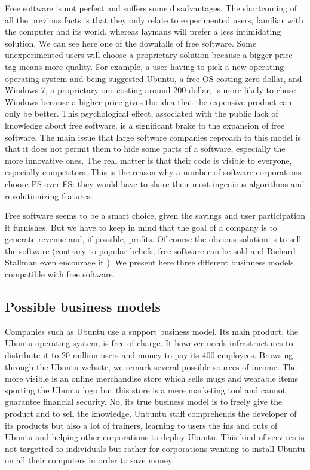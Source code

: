 \documentclass[12pt]{article}
\begin{document}
Free software is not perfect and suffers some disadvantages. The
shortcoming of all the previous facts is that they only relate to
experimented users, familiar with the computer and its world, whereas
laymans will prefer a less intimidating solution. We can see here one
of the downfalls of free software. Some unexperimented users will
choose a proprietary solution because a bigger price tag means more
quality.  For example, a user having to pick a new operating operating
system and being suggested Ubuntu, a free OS costing zero dollar, and
Windows 7, a proprietary one costing around 200 dollar, is more likely
to chose Windows because a higher price gives the idea that the
expensive product can only be better.  This psychological effect,
associated with the public lack of knowledge about free software, is a
significant brake to the expansion of free software. The main issue
that large software companies reproach to this model is that it does
not permit them to hide some parts of a software, especially the more
innovative ones. The real matter is that their code is visible to
everyone, especially competitors. This is the reason why a number of
software corporations choose PS over FS: they would have to share
their most ingenious algorithms and revolutionizing features.

Free software seems to be a smart choice, given the savings and user
participation it furnishes. But we have to keep in mind that the goal
of a company is to generate revenue and, if possible, profits. Of
course the obvious solution is to sell the software (contrary to
popular beliefs, free software can be sold and Richard Stallman even
encourage it \cite{sell}). We present here three different businness
models compatible with free software.

\subsection{Possible business models}

Companies such as Ubuntu use a support business model. Its main
product, the Ubuntu operating system, is free of charge. It however
needs infrastructures to distribute it to 20 million users and money
to pay its 400 employees. Browsing through the Ubuntu website, we
remark several possible sources of income. The more visible is an
online merchandise store which sells mugs and wearable items sporting
the Ubuntu logo but this store is a mere marketing tool and cannot
guarantee financial security.  No, its true business model is to
freely give the product and to sell the knowledge. Unbuntu staff
comprehends the developer of its products but also a lot of trainers,
learning to users the ins and outs of Ubuntu and helping other
corporations to deploy Ubuntu. This kind of services is not targetted
to individuals but rather for corporations wanting to install Ubuntu
on all their computers in order to save money.
\end{document}
